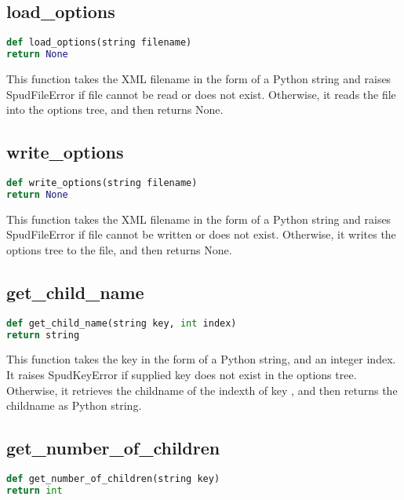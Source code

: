 \documentclass[a4paper, 11pt]{book}
\begin{document}
\subsection{load\_options}

\begin{lstlisting}[language=Python]
def load_options(string filename)
return None
\end{lstlisting}

This function takes the XML filename in the form of a Python string and raises SpudFileError if file cannot be read or does not exist.
Otherwise, it reads the file into the options tree, and then returns None.

\subsection{write\_options}

\begin{lstlisting}[language=Python]
def write_options(string filename)
return None
\end{lstlisting}

This function takes the XML filename in the form of a Python string and raises SpudFileError if file cannot be written or does not exist.
Otherwise, it writes the options tree to the file, and then returns None.

\subsection{get\_child\_name}

\begin{lstlisting}[language=Python]
def get_child_name(string key, int index)
return string
\end{lstlisting}

This function takes the key in the form of a Python string, and an integer index. 
It raises SpudKeyError if supplied key does not exist in the options tree.
Otherwise, it retrieves the childname of the indexth of key , and then returns the childname as Python string.

\subsection{get\_number\_of\_children}

\begin{lstlisting}[language=Python]
def get_number_of_children(string key)
return int
\end{lstlisting}
\end{document}
